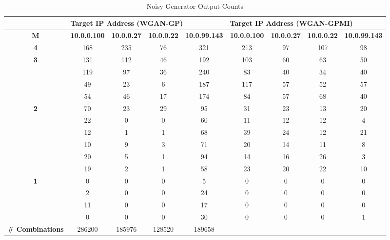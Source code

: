 \begin{table}[!htbp]
	\centering
	\caption{Noisy Generator Output Counts}
	\label{tab:random_outputs}
	\begin{adjustbox}{angle=90}
		\begin{tabular}{c|c|c|c|c|c|c|c|c}
			\multicolumn{1}{l|}{} & \multicolumn{4}{l|}{\textbf{Target IP Address (WGAN-GP)}} & \multicolumn{4}{l}{\textbf{Target IP Address (WGAN-GPMI)}} \\ \hline

			\textbf{M} & \multicolumn{1}{l|}{\textbf{10.0.0.100}} & \multicolumn{1}{l|}{\textbf{10.0.0.27}} & \multicolumn{1}{l|}{\textbf{10.0.0.22}} & \multicolumn{1}{l|}{\textbf{10.0.99.143}} & \multicolumn{1}{l|}{\textbf{10.0.0.100}} & \multicolumn{1}{l|}{\textbf{10.0.0.27}} & \multicolumn{1}{l|}{\textbf{10.0.0.22}} & \multicolumn{1}{l}{\textbf{10.0.99.143}} \\
			\hline
			\textbf{4} & 168 & 235 & 76 & 321 & 213 & 97 & 107 & 98 \\
			\hline
			\multirow{4}{*}{\textbf{3}} & 131 & 112 & 46 & 192 & 103 & 60 & 63 & 50 \\
			& 119 & 97 & 36  & 240 & 83 & 40 & 34 & 40 \\
			& 49  & 23 & 6  & 187  & 117 & 57  & 52 & 57 \\
			& 54  & 46 & 17 & 174  & 84  & 57  & 68 & 40 \\
			\hline
			\multirow{6}{*}{\textbf{2}} & 70 & 23 & 29 & 95 & 31 & 23 & 13 & 20 \\
			& 22  & 0 & 0  & 60 & 11 & 12 & 12 & 4  \\
			& 12  & 1 & 1  & 68 & 39 & 24 & 12 & 21 \\
			& 10  & 9 & 3  & 71 & 20 & 14 & 11 & 8  \\
			& 20  & 5 & 1  & 94 & 14 & 16 & 26 & 3  \\
			& 19  & 2 & 1  & 58 & 23 & 20 & 22 & 10 \\
			\hline
			\multirow{4}{*}{\textbf{1}} & 0  & 0  & 0  & 5  & 0  & 0  & 0  & 0  \\
			& 2   & 0 & 0  & 24 & 0  & 0  & 0  & 0  \\
			& 11  & 0 & 0  & 17 & 0  & 0  & 0  & 0  \\
			& 0   & 0 & 0  & 30 & 0  & 0  & 0  & 1  \\
			\hline
			\multicolumn{1}{l|}{\textbf{\# Combinations}} & 286200 & 185976 & 128520 & 189658 & \multicolumn{1}{l|}{} & \multicolumn{1}{l|}{} & \multicolumn{1}{l|}{} & \multicolumn{1}{l}{}
		\end{tabular}
	\end{adjustbox}
\end{table}
